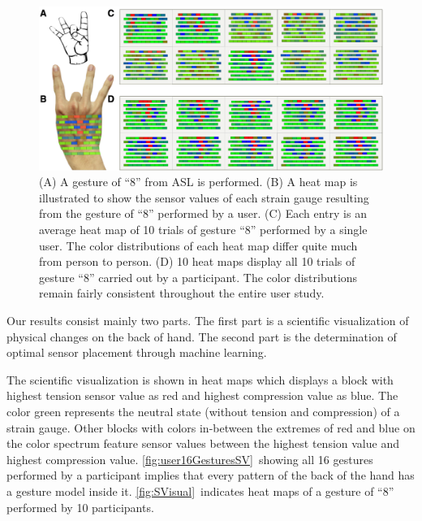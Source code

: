 \documentclass{sigchi}
\begin{document}
\begin{figure}
 \begin{center}
  \includegraphics[width=2\columnwidth]{figures/SVisual_v2.pdf}
  \caption{
    (A) A gesture of ``8'' from ASL is performed.
    (B) A heat map is illustrated to show the sensor values of each strain gauge resulting from the gesture of ``8'' performed by a user. 
    (C) Each entry is an average heat map of 10 trials of gesture ``8'' performed by a single user. The color distributions of each heat map differ quite much from person to person.
    (D) 10 heat maps display all 10 trials of gesture ``8'' carried out by a participant. The color distributions remain fairly consistent throughout the entire user study.
  }
  \label{fig:SVisual}
  \end{center}
\end{figure}

Our results consist mainly two parts. The first part is a scientific visualization of physical changes on the back of hand. The second part is the determination of optimal sensor placement through machine learning.

The scientific visualization is shown in heat maps which displays a block with highest tension sensor value as red and highest compression value as blue. The color green represents the neutral state (without tension and compression) of a strain gauge. Other blocks with colors in-between the extremes of red and blue on the color spectrum feature sensor values between the highest tension value and highest compression value. \autoref{fig:user16GesturesSV}\ showing all 16 gestures performed by a participant implies that every pattern of the back of the hand has a gesture model inside it. \autoref{fig:SVisual}\ indicates heat maps of a gesture of ``8'' performed by 10 participants. 
\end{document}
